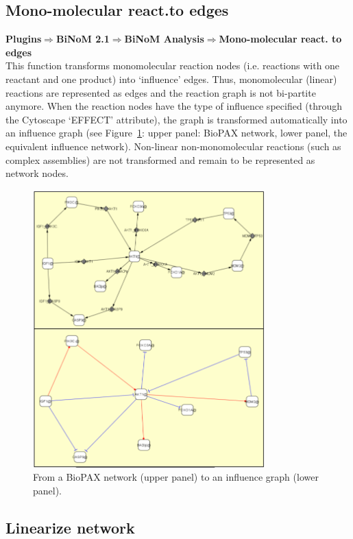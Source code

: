 \subsection{Mono-molecular react.to edges}
\textbf{Plugins$\Rightarrow$BiNoM 2.1$\Rightarrow$BiNoM Analysis$\Rightarrow$Mono-molecular react. to edges}\\
This function transforms monomolecular reaction nodes (i.e. reactions with one
reactant and one product) into ‘influence’ edges. Thus, monomolecular (linear)
reactions are represented as edges and the reaction graph is not bi-partite
anymore. When the reaction nodes have the type of influence specified (through
the Cytoscape ‘EFFECT’ attribute), the graph is transformed automatically into an
influence graph (see Figure~\ref{Network_to_influence_graph}: upper panel:
BioPAX network, lower panel, the equivalent influence network). Non-linear
non-monomolecular reactions (such as complex assemblies) are not transformed and
remain to be represented as network nodes.
\begin{figure}
\centering
\includegraphics[width=0.8\textwidth]{graphics/Network_to_influence_graph}
\caption{From a BioPAX network (upper panel) to an influence graph (lower panel).}
\label{Network_to_influence_graph}
\end{figure}

\subsection{Linearize network}

